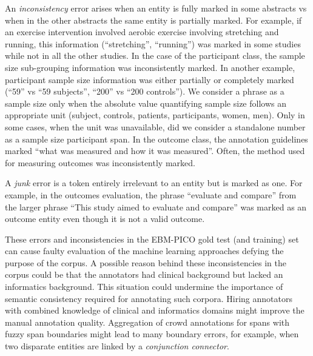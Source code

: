 \documentclass[10.7pt,]{article}
\begin{document}
An \textit{inconsistency} error arises when an entity is fully marked in some abstracts vs when in the other abstracts the same entity is partially marked. 
For example, if an exercise intervention involved aerobic exercise involving stretching and running, this information (``stretching'', ``running'') was marked in some studies while not in all the other studies.
In the case of the participant class, the sample size sub-grouping information was inconsistently marked.
In another example, participant sample size information was either partially or completely marked (``59'' vs ``59 subjects'', ``200'' vs ``200 controls'').
We consider a phrase as a sample size only when the absolute value quantifying sample size follows an appropriate unit (subject, controls, patients, participants, women, men). 
Only in some cases, when the unit was unavailable, did we consider a standalone number as a sample size participant span.
In the outcome class, the annotation guidelines marked ``what was measured and how it was measured''. 
Often, the method used for measuring outcomes was inconsistently marked.



A \textit{junk} error is a token entirely irrelevant to an entity but is marked as one.
For example, in the outcomes evaluation, the phrase ``evaluate and compare'' from the larger phrase ``This study aimed to evaluate and compare'' was marked as an outcome entity even though it is not a valid outcome.



These errors and inconsistencies in the EBM-PICO gold test (and training) set can cause faulty evaluation of the machine learning approaches defying the purpose of the corpus.
A possible reason behind these inconsistencies in the corpus could be that the annotators had clinical background but lacked an informatics background.
This situation could undermine the importance of semantic consistency required for annotating such corpora.
Hiring annotators with combined knowledge of clinical and informatics domains might improve the manual annotation quality.
Aggregation of crowd annotations for spans with fuzzy span boundaries might lead to many boundary errors, for example, when two disparate entities are linked by a \textit{conjunction connector}.
%
\end{document}
